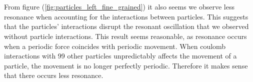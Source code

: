 \\\\
From figure (\ref{fig:particles_left_fine_grained}) it also seems we observe less resonance when accounting for the interactions between particles. This suggests that the particles' interactions disrupt the resonant oscillation that we observed without particle interactions. This result seems reasonable, as resonance occurs when a periodic force coincides with periodic movement. When coulomb interactions with 99 other particles unpredictably affects the movement of a particle, the movement is no longer perfectly periodic. Therefore it makes sense that there occurs less resonance. 

